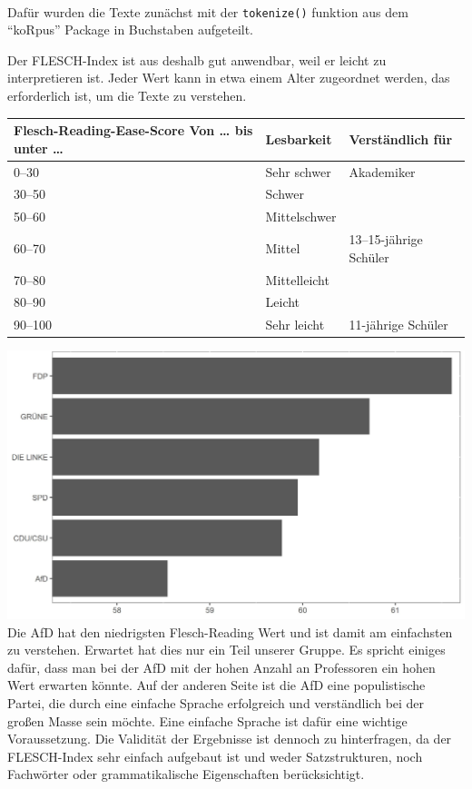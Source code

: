 \\


\noindent Dafür wurden die Texte zunächst mit der \texttt{tokenize()} funktion aus dem ``koRpus'' Package in Buchstaben aufgeteilt. 

Der FLESCH-Index ist aus deshalb gut anwendbar, weil er leicht zu interpretieren ist. Jeder Wert kann in etwa einem Alter zugeordnet werden, das erforderlich ist, um die Texte zu verstehen. 

\begin{longtable}[]{@{}lll@{}}
	\toprule
	Flesch-Reading-Ease-Score Von \ldots{} bis unter \ldots{} & Lesbarkeit &
	Verständlich für\tabularnewline
	\midrule
	\endhead
	0--30 & Sehr schwer & Akademiker\tabularnewline
	30--50 & Schwer &\tabularnewline
	50--60 & Mittelschwer &\tabularnewline
	60--70 & Mittel & 13--15-jährige Schüler\tabularnewline
	70--80 & Mittelleicht &\tabularnewline
	80--90 & Leicht &\tabularnewline
	90--100 & Sehr leicht & 11-jährige Schüler\tabularnewline
	\bottomrule
\end{longtable}


\includegraphics[width=\linewidth]{Grafiken/Readability_line.jpg}\\

Die AfD hat den niedrigsten Flesch-Reading Wert und ist damit am einfachsten zu verstehen. Erwartet hat dies nur ein Teil unserer Gruppe. Es spricht einiges dafür, dass man bei der AfD mit der hohen Anzahl an Professoren ein hohen Wert erwarten könnte. Auf der anderen Seite ist die AfD eine populistische Partei, die durch eine einfache Sprache erfolgreich und verständlich bei der großen Masse sein möchte. Eine einfache Sprache ist dafür eine wichtige Voraussetzung. Die Validität der Ergebnisse ist dennoch zu hinterfragen, da der FLESCH-Index sehr einfach aufgebaut ist und weder Satzstrukturen, noch Fachwörter oder grammatikalische Eigenschaften berücksichtigt. 


